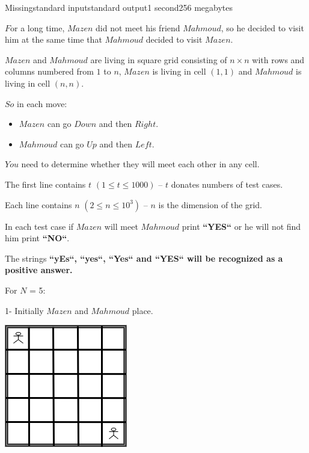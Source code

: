 \begin{problem}{Missing}{standard input}{standard output}{1 second}{256 megabytes}

$F$or a long time, $Mazen$ did not meet his friend $Mahmoud$, so he decided to visit him at the same time that $Mahmoud$ decided to visit $Mazen$.

$Mazen$ and $Mahmoud$ are living in square grid consisting of $n \times n$ with rows and columns numbered from $1$ to $n$, $Mazen$ is living in cell $(1,1)$ and $Mahmoud$ is living in cell $(n,n)$.

$So$ in each move:
\begin{itemize}
  \item $Mazen$ can go $Down$ and then $Right$.
  \item $Mahmoud$ can go $Up$ and then $Left$.
\end{itemize}

$You$ need to determine whether they will meet each other in any cell.

\InputFile
The first line contains $t$ $(1 \le t \le 1000)$ -- $t$ donates numbers of test cases.

Each line contains $n$ $(2 \le n \le 10^3)$ -- $n$ is the dimension of the grid.

\OutputFile
In each test case if $Mazen$ will meet $Mahmoud$ print \textbf{``YES``} or he will not find him print \textbf{``NO``}.

The strings \bf{``yEs``}, \bf{``yes``}, \bf{``Yes``} and \bf{``YES``} will be recognized as a positive answer.

\Example

\begin{example}
%
\end{example}

\Note
For $N$ = 5:

1- Initially $Mazen$ and $Mahmoud$ place.
\begin{center}
  \includegraphics[scale=1.5]{Initialyf.drawio.png} \\
  \small{}
\end{center}


\end{problem}
